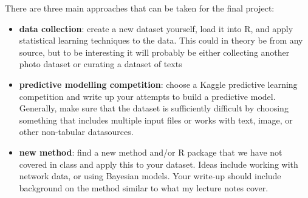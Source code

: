 \documentclass[12pt]{article}
\begin{document}
There are three main approaches that can be taken for the final project:

\begin{itemize}
\item \textbf{data collection}: create a new dataset yourself, load it into R, and apply statistical learning techniques to the data. This could in theory be from any source, but to be interesting it will probably be either collecting another photo dataset or curating a dataset of texts
\item \textbf{predictive modelling competition}: choose a Kaggle predictive learning competition and write up your attempts to build a predictive model. Generally, make sure that the dataset is sufficiently difficult by choosing something that includes multiple input files or works with text, image, or other non-tabular datasources.
\item \textbf{new method}: find a new method and/or R package that we have not covered in class and apply this to your dataset. Ideas include working with network data, or using Bayesian models. Your write-up should include background on the method similar to what my lecture notes cover.
\end{itemize}





\end{document}
